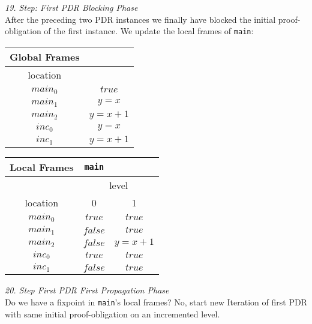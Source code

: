 \documentclass{article}
\begin{document}
\vspace*{2em}

\textsl{19. Step: First PDR Blocking Phase} \\
After the preceding two PDR instances we finally have blocked the initial proof-obligation of the first instance. We update the local frames of \texttt{main}: \\

	\begin{minipage}{.4\textwidth}
	\setlength\tabcolsep{0.35em}
	\begin{center}
		\begin{tabu}{cc}
			Global Frames \\
			\toprule
			location &  \\
			$main_0$ & $true$  \\
			$main_1$ & $y = x$\\
			$main_2$ & $y = x + 1$ \\
			$inc_0$ & $y = x$  \\
			$inc_1$ & $y = x + 1$\\
			\bottomrule
		\end{tabu}
	\end{center}
\end{minipage}
\hfill
\begin{minipage}{.4\textwidth}
	\setlength\tabcolsep{0.35em}
		\begin{center}
			\begin{tabu}{ccc}
				Local Frames & \texttt{main}\\
				\toprule
				& \multicolumn{2}{c}{level} \\
				\cmidrule(lr){2-3}
				location & 0 & 1 \\
				\cmidrule{1-3}
				$main_0$ & $true$ & $true$ \\
				$main_1$ & $false$ & $true$\\
				$main_2$ & $false$ & $y = x + 1$\\
				$inc_0$ & $true$ & $true$\\
				$inc_1$ & $false$ & $true$\\
				\bottomrule
			\end{tabu}
		\end{center}	
\end{minipage}

\vspace*{2em}

\textsl{20. Step First PDR First Propagation Phase} \\
Do we have a fixpoint in \texttt{main}'s local frames? No, start new Iteration of first PDR with same initial proof-obligation on an incremented level. \\ \\
\end{document}
